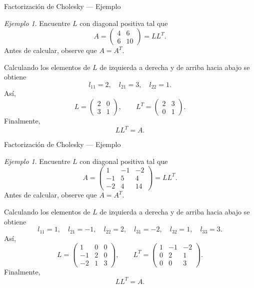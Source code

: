 \documentclass[aspectratio=169,11pt]{beamer}
\theoremstyle{remark}
\newtheorem{Ejem}[definicion]{Ejemplo}
\begin{document}
\begin{frame}[shrink=5]{Factorización de Cholesky — Ejemplo}
\footnotesize
\begin{Ejem}

Encuentre $L$ con diagonal positiva tal que
\[
A=\begin{pmatrix}4 & 6\\6 & 10\end{pmatrix}=LL^T.
\]
Antes de calcular, observe que $A=A^T$.

Calculando los elementos de $L$ de izquierda a derecha y de arriba hacia abajo se obtiene
\[
l_{11}=2,\quad l_{21}=3,\quad l_{22}=1.
\]
Así,
\[
L=\begin{pmatrix}2 & 0\\3 & 1\end{pmatrix},\qquad L^T=\begin{pmatrix}2 & 3\\0 & 1\end{pmatrix}.
\]
Finalmente,
\[
\boxed{LL^T=A}.
\]
\end{Ejem}
\end{frame}

\begin{frame}[shrink=5]{Factorización de Cholesky — Ejemplo}
\footnotesize
\begin{Ejem}

Encuentre $L$ con diagonal positiva tal que
\[
A=\begin{pmatrix}1 & -1 & -2\\-1 & 5 & 4\\-2 & 4 & 14\end{pmatrix}=LL^T.
\]
Antes de calcular, observe que $A=A^T$.

Calculando los elementos de $L$ de izquierda a derecha y de arriba hacia abajo se obtiene
\[
l_{11}=1,\quad l_{21}=-1,\quad l_{22}=2,\quad l_{31}=-2,\quad l_{32}=1,\quad l_{33}=3.
\]
Así,
\[
L=\begin{pmatrix}1 & 0 & 0\\-1 & 2 & 0\\-2 & 1 & 3\end{pmatrix},\qquad L^T=\begin{pmatrix}1 & -1 & -2\\0 & 2 & 1\\0 & 0 & 3\end{pmatrix}.
\]
Finalmente,
\[
\boxed{LL^T=A}.
\]

\end{Ejem}
\end{frame}
\end{document}
